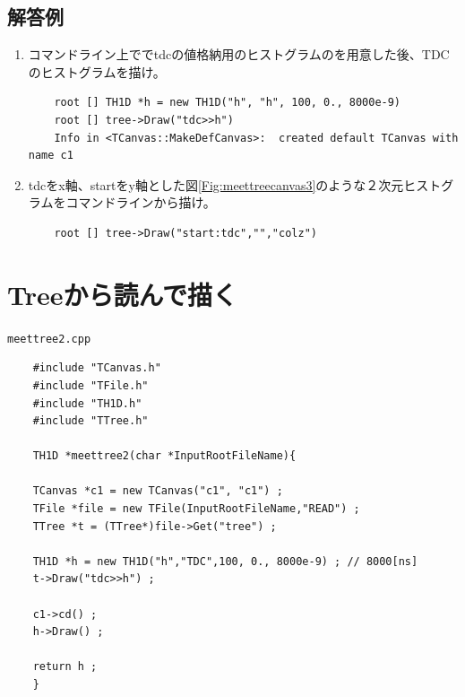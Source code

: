 \documentclass{jarticle}
\begin{document}
  \subsection{解答例}
  \begin{enumerate}
   \item コマンドライン上ででtdcの値格納用のヒストグラムのを用意した後、TDCのヒストグラムを描け。
\begin{verbatim}
	root [] TH1D *h = new TH1D("h", "h", 100, 0., 8000e-9)
	root [] tree->Draw("tdc>>h")
	Info in <TCanvas::MakeDefCanvas>:  created default TCanvas with name c1
\end{verbatim}
   \item tdcをx軸、startをy軸とした図\ref{Fig:meettreecanvas3}のような２次元ヒストグラムをコマンドラインから描け。
\begin{verbatim}
	root [] tree->Draw("start:tdc","","colz")
\end{verbatim}
  \end{enumerate}


 \section{Treeから読んで描く}

 \begin{itembox}{\texttt{meettree2.cpp}}
\begin{verbatim}
	#include "TCanvas.h"
	#include "TFile.h"
	#include "TH1D.h"
	#include "TTree.h"

	TH1D *meettree2(char *InputRootFileName){

	TCanvas *c1 = new TCanvas("c1", "c1") ;
	TFile *file = new TFile(InputRootFileName,"READ") ;
	TTree *t = (TTree*)file->Get("tree") ;

	TH1D *h = new TH1D("h","TDC",100, 0., 8000e-9) ; // 8000[ns]
	t->Draw("tdc>>h") ;

	c1->cd() ;
	h->Draw() ;

	return h ;
	}
\end{verbatim}
 \end{itembox}
\end{document}
